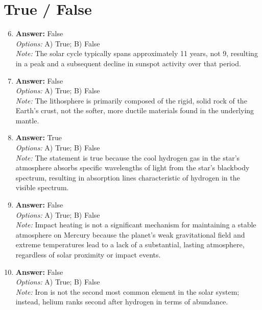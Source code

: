 \documentclass[12pt]{article}
\begin{document}
\section*{True / False}
\begin{enumerate}[label=\arabic*.]
\setcounter{enumi}{5}
\item \textbf{Answer:} False
\\ \textit{Options:} A) True; B) False
\\ \textit{Note:} The solar cycle typically spans approximately 11 years, not 9, resulting in a peak and a subsequent decline in sunspot activity over that period.
\item \textbf{Answer:} False
\\ \textit{Options:} A) True; B) False
\\ \textit{Note:} The lithosphere is primarily composed of the rigid, solid rock of the Earth's crust, not the softer, more ductile materials found in the underlying mantle.
\item \textbf{Answer:} True
\\ \textit{Options:} A) True; B) False
\\ \textit{Note:} The statement is true because the cool hydrogen gas in the star's atmosphere absorbs specific wavelengths of light from the star's blackbody spectrum, resulting in absorption lines characteristic of hydrogen in the visible spectrum.
\item \textbf{Answer:} False
\\ \textit{Options:} A) True; B) False
\\ \textit{Note:} Impact heating is not a significant mechanism for maintaining a stable atmosphere on Mercury because the planet's weak gravitational field and extreme temperatures lead to a lack of a substantial, lasting atmosphere, regardless of solar proximity or impact events.
\item \textbf{Answer:} False
\\ \textit{Options:} A) True; B) False
\\ \textit{Note:} Iron is not the second most common element in the solar system; instead, helium ranks second after hydrogen in terms of abundance.
\end{enumerate}
\end{document}
